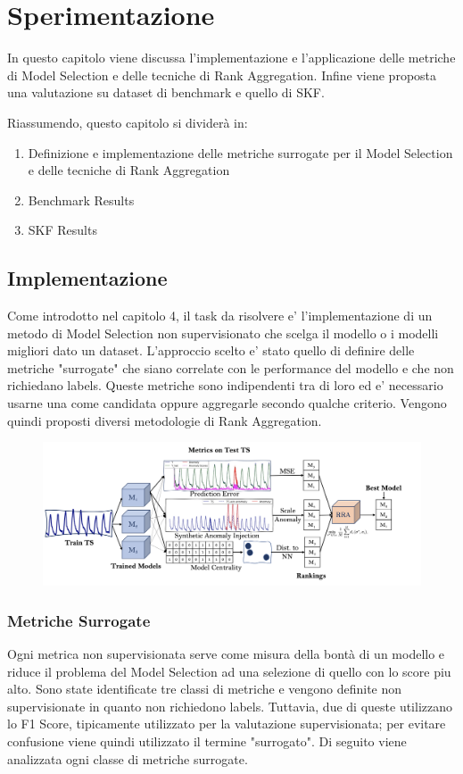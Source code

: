 \chapter{Sperimentazione}
In questo capitolo viene discussa l'implementazione e l'applicazione delle metriche di Model Selection e delle tecniche di Rank Aggregation. Infine viene proposta una valutazione su dataset di benchmark e quello di SKF.

Riassumendo, questo capitolo si dividerà in:
\begin{enumerate}
\item Definizione e implementazione delle metriche surrogate per il Model Selection e delle tecniche di Rank Aggregation
\item Benchmark Results
\item SKF Results
\end{enumerate}


\section{Implementazione}
Come introdotto nel capitolo 4, il task da risolvere e' l'implementazione di un metodo di Model Selection non supervisionato che scelga il modello o i modelli migliori dato un dataset. L'approccio scelto e' stato quello di definire delle metriche "surrogate" che siano correlate con le performance del modello e che non richiedano labels. Queste metriche sono indipendenti tra di loro ed e' necessario usarne una come candidata oppure aggregarle secondo qualche criterio. Vengono quindi proposti diversi metodologie di Rank Aggregation. 
\begin{figure}[t]
\includegraphics[width=14cm, scale=1]{images/model-selection-scheme}
\centering
\end{figure}

\subsection{Metriche Surrogate}
Ogni metrica non supervisionata serve come misura della bontà di un modello e riduce il problema del Model Selection ad una selezione di quello con lo score piu alto. 
Sono state identificate tre classi di metriche e vengono definite non supervisionate in quanto non richiedono labels. Tuttavia, due di queste utilizzano lo F1 Score, tipicamente utilizzato per la valutazione supervisionata; per evitare confusione viene quindi utilizzato il termine "surrogato".
Di seguito viene analizzata ogni classe di metriche surrogate. 


